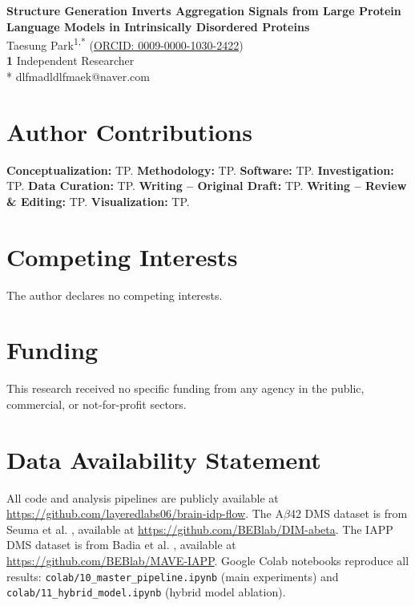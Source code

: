 \documentclass[10pt,letterpaper]{article}
\begin{document}
\vspace*{0.2in}

\begin{flushleft}
{\Large\textbf{Structure Generation Inverts Aggregation Signals from Large Protein Language Models in Intrinsically Disordered Proteins}}
\newline
\\
Taesung Park\textsuperscript{1,*} (\href{https://orcid.org/0009-0000-1030-2422}{ORCID: 0009-0000-1030-2422})
\\
\bigskip
\textbf{1} Independent Researcher
\\
\bigskip
* dlfmadldlfmaek@naver.com

\end{flushleft}

\section*{Author Contributions}
\textbf{Conceptualization:} TP. \textbf{Methodology:} TP. \textbf{Software:} TP. \textbf{Investigation:} TP. \textbf{Data Curation:} TP. \textbf{Writing -- Original Draft:} TP. \textbf{Writing -- Review \& Editing:} TP. \textbf{Visualization:} TP.

\section*{Competing Interests}
The author declares no competing interests.

\section*{Funding}
This research received no specific funding from any agency in the public, commercial, or not-for-profit sectors.

\section*{Data Availability Statement}
All code and analysis pipelines are publicly available at \url{https://github.com/layeredlabs06/brain-idp-flow}. The A$\beta$42 DMS dataset is from Seuma et al. \cite{seuma2022}, available at \url{https://github.com/BEBlab/DIM-abeta}. The IAPP DMS dataset is from Badia et al. \cite{badia2026}, available at \url{https://github.com/BEBlab/MAVE-IAPP}. Google Colab notebooks reproduce all results: \texttt{colab/10\_master\_pipeline.ipynb} (main experiments) and \texttt{colab/11\_hybrid\_model.ipynb} (hybrid model ablation).
\end{document}
